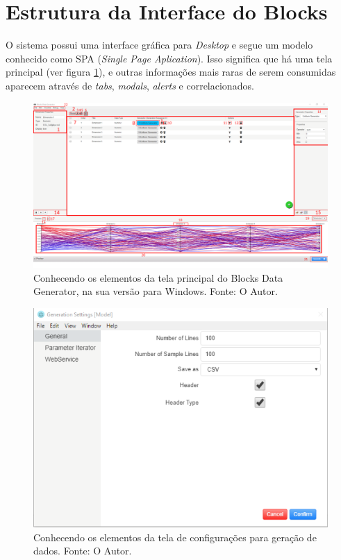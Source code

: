\documentclass[
	12pt,				%
	openright,			%
	twoside,			%
	a4paper,			%
	english,			%
	brazil				%
	]{abntex2}
\begin{document}
	\section{Estrutura da Interface do Blocks}
		O sistema possui uma interface gráfica para \emph{Desktop} e segue um modelo conhecido como SPA (\emph{Single Page Aplication}).
		Isso significa que há uma tela principal (ver figura \ref{fig:telaPrincipal}), e outras informações mais raras de serem consumidas aparecem através de \emph{tabs}, \emph{modals}, \emph{alerts} e correlacionados.
		\begin{figure}[h]
			\centering
			\includegraphics[width=\linewidth]{./figures/prototipo/telaprincipalmarcada.png}
			\caption{Conhecendo os elementos da tela principal do Blocks Data Generator, na sua versão para Windows. Fonte: O Autor.}
			\label{fig:telaPrincipal}
		\end{figure}
		\begin{figure}[h]
			\centering
			\includegraphics[width=\linewidth]{./figures/prototipo/generationSettings.png}
			\caption{Conhecendo os elementos da tela de configurações para geração de dados. Fonte: O Autor.}
			\label{fig:generationSettings}
		\end{figure}
\end{document}

